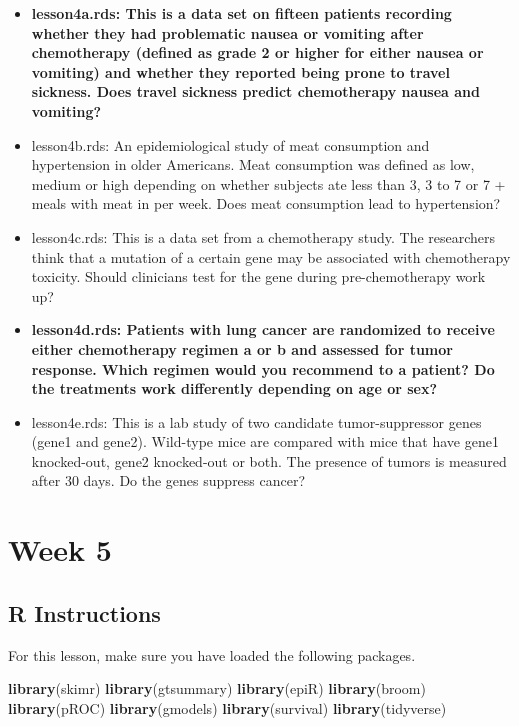 \documentclass[]{book}
\newenvironment{Shaded}{\begin{snugshade}}{\end{snugshade}}
\newcommand{\KeywordTok}[1]{\textcolor[rgb]{0.13,0.29,0.53}{\textbf{#1}}}
\newcommand{\NormalTok}[1]{#1}
\providecommand{\tightlist}{%
  \setlength{\itemsep}{0pt}\setlength{\parskip}{0pt}}
\begin{document}
\begin{itemize}
\tightlist
\item
  \textbf{lesson4a.rds: This is a data set on fifteen patients recording
  whether they had problematic nausea or vomiting after chemotherapy
  (defined as grade 2 or higher for either nausea or vomiting) and
  whether they reported being prone to travel sickness. Does travel
  sickness predict chemotherapy nausea and vomiting?}
\item
  lesson4b.rds: An epidemiological study of meat consumption and
  hypertension in older Americans. Meat consumption was defined as low,
  medium or high depending on whether subjects ate less than 3, 3 to 7
  or 7 + meals with meat in per week. Does meat consumption lead to
  hypertension?
\item
  lesson4c.rds: This is a data set from a chemotherapy study. The
  researchers think that a mutation of a certain gene may be associated
  with chemotherapy toxicity. Should clinicians test for the gene during
  pre-chemotherapy work up?
\item
  \textbf{lesson4d.rds: Patients with lung cancer are randomized to
  receive either chemotherapy regimen a or b and assessed for tumor
  response. Which regimen would you recommend to a patient? Do the
  treatments work differently depending on age or sex?}
\item
  lesson4e.rds: This is a lab study of two candidate tumor-suppressor
  genes (gene1 and gene2). Wild-type mice are compared with mice that
  have gene1 knocked-out, gene2 knocked-out or both. The presence of
  tumors is measured after 30 days. Do the genes suppress cancer?
\end{itemize}

\hypertarget{week-5}{%
\chapter{Week 5}\label{week-5}}

\hypertarget{r-instructions-4}{%
\section{R Instructions}\label{r-instructions-4}}

For this lesson, make sure you have loaded the following packages.

\begin{Shaded}
\begin{Highlighting}[]
\KeywordTok{library}\NormalTok{(skimr)}
\KeywordTok{library}\NormalTok{(gtsummary)}
\KeywordTok{library}\NormalTok{(epiR)}
\KeywordTok{library}\NormalTok{(broom)}
\KeywordTok{library}\NormalTok{(pROC)}
\KeywordTok{library}\NormalTok{(gmodels)}
\KeywordTok{library}\NormalTok{(survival)}
\KeywordTok{library}\NormalTok{(tidyverse)}
\end{Highlighting}
\end{Shaded}
\end{document}
